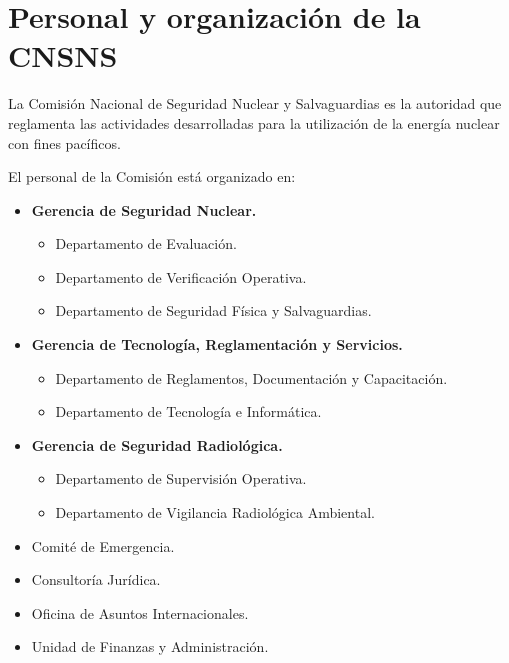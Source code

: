 \section{Personal y organización de la CNSNS}

La Comisión Nacional de Seguridad Nuclear y Salvaguardias es la autoridad que reglamenta las actividades desarrolladas para la utilización de la energía nuclear con fines pacíficos.

El personal de la Comisión está organizado en:
\begin{itemize}
  \item \textbf{Gerencia de Seguridad Nuclear.}
  \begin{itemize}
    \item Departamento de Evaluación.
    \item Departamento de Verificación Operativa.
    \item Departamento de Seguridad Física y Salvaguardias.
  \end{itemize}
  \item \textbf{Gerencia de Tecnología, Reglamentación y Servicios.}
  \begin{itemize}
    \item Departamento de Reglamentos, Documentación y Capacitación.
    \item Departamento de Tecnología e Informática.
  \end{itemize}
  \item \textbf{Gerencia de Seguridad Radiológica.}
  \begin{itemize}
    \item Departamento de Supervisión Operativa.
    \item Departamento de Vigilancia Radiológica Ambiental.
  \end{itemize}
  \item Comité de Emergencia.
  \item Consultoría Jurídica.
  \item Oficina de Asuntos Internacionales.
  \item Unidad de Finanzas y Administración.
\end{itemize}
